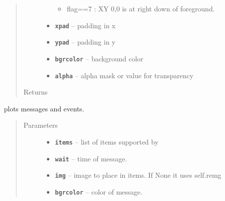 \documentclass[letterpaper,10pt,english]{sphinxmanual}
\begin{document}
\begin{fulllineitems}
\begin{fulllineitems}
\begin{quote}
\begin{description}
\begin{itemize}
\begin{itemize}
\item {} 
flag==7 : XY 0,0 is at right down of foreground.

\end{itemize}


\item {} 
\textbf{\texttt{xpad}} -- padding in x

\item {} 
\textbf{\texttt{ypad}} -- padding in y

\item {} 
\textbf{\texttt{bgrcolor}} -- background color

\item {} 
\textbf{\texttt{alpha}} -- alpha mask or value for transparency

\end{itemize}

\item[{Returns}] \leavevmode


\end{description}\end{quote}

\end{fulllineitems}


\begin{fulllineitems}
\label{RRtoolbox.lib:RRtoolbox.lib.plotter.plotim.plotintime}
plots messages and events.
\begin{quote}\begin{description}
\item[{Parameters}] \leavevmode\begin{itemize}
\item {} 
\textbf{\texttt{items}} -- list of items supported by {\hyperref[RRtoolbox.lib:RRtoolbox.lib.plotter.plotim.makeoverlay]{\emph{}}}

\item {} 
\textbf{\texttt{wait}} -- time of message.

\item {} 
\textbf{\texttt{img}} -- image to place in items. If None it uses self.remg

\item {} 
\textbf{\texttt{bgrcolor}} -- color of message.

\end{itemize}


\end{description}
\end{quote}
\end{fulllineitems}
\end{fulllineitems}
\end{document}
